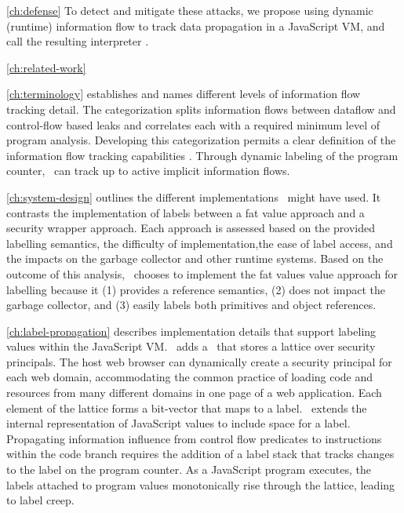 \autoref{ch:defense} 
To detect and mitigate these attacks, we propose using dynamic (runtime) information flow to track data propagation in a JavaScript VM, and call the resulting interpreter \FlowCore.

\autoref{ch:related-work} 

\autoref{ch:terminology} establishes and names different levels of information flow tracking detail.
The categorization splits information flows between dataflow and control-flow based leaks and correlates each with a required minimum level of program analysis.
Developing this categorization permits a clear definition of the information flow tracking capabilities \FlowCore.
Through dynamic labeling of the program counter, \FlowCore\ can track up to active implicit information flows.

\autoref{ch:system-design} outlines the different implementations \FlowCore\ might have used.
It contrasts the implementation of labels between a fat value approach and a security wrapper approach.
Each approach is assessed based on the provided labelling semantics, the difficulty of implementation,the ease of label access, and the impacts on the garbage collector and other runtime systems.
Based on the outcome of this analysis, \FlowCore\ chooses to implement the fat values value approach for labelling because it (1) provides a reference semantics, (2) does not impact the garbage collector, and (3) easily labels both primitives and object references.

\autoref{ch:label-propagation} describes implementation details that support labeling values within the JavaScript VM.
\FlowCore\ adds a \FlowLabelRegistry\ that stores a lattice over security principals.
The host web browser can dynamically create a security principal for each web domain, accommodating the common practice of loading code and resources from many different domains in one page of a web application.
Each element of the lattice forms a bit-vector that maps to a label.
\FlowCore\ extends the internal representation of JavaScript values to include space for a label.
Propagating information influence from control flow predicates to instructions within the code branch requires the addition of a label stack that tracks changes to the label on the program counter.
As a JavaScript program executes, the labels attached to program values monotonically rise through the lattice, leading to label creep.

